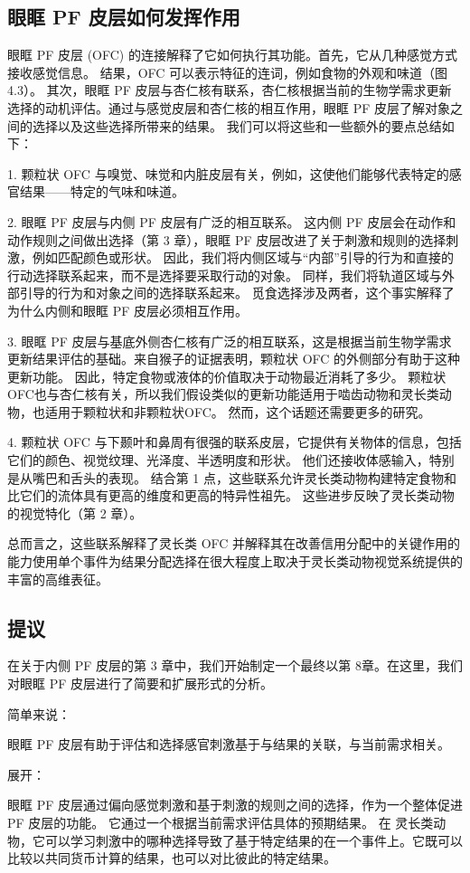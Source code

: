 \subsection{眼眶 PF 皮层如何发挥作用}
眼眶 PF 皮层 (OFC) 的连接解释了它如何执行其功能。首先，它从几种感觉方式接收感觉信息。 结果，OFC 可以表示特征的连词，例如食物的外观和味道（图 4.3）。 其次，眼眶 PF 皮层与杏仁核有联系，杏仁核根据当前的生物学需求更新选择的动机评估。通过与感觉皮层和杏仁核的相互作用，眼眶 PF 皮层了解对象之间的选择以及这些选择所带来的结果。 我们可以将这些和一些额外的要点总结如下：\par
1. 颗粒状 OFC 与嗅觉、味觉和内脏皮层有关，例如，这使他们能够代表特定的感官结果——特定的气味和味道。\par
2. 眼眶 PF 皮层与内侧 PF 皮层有广泛的相互联系。 这内侧 PF 皮层会在动作和动作规则之间做出选择（第 3 章），眼眶 PF 皮层改进了关于刺激和规则的选择刺激，例如匹配颜色或形状。 因此，我们将内侧区域与“内部”引导的行为和直接的行动选择联系起来，而不是选择要采取行动的对象。 同样，我们将轨道区域与外部引导的行为和对象之间的选择联系起来。 觅食选择涉及两者，这个事实解释了为什么内侧和眼眶 PF 皮层必须相互作用。\par
3. 眼眶 PF 皮层与基底外侧杏仁核有广泛的相互联系，这是根据当前生物学需求更新结果评估的基础。来自猴子的证据表明，颗粒状 OFC 的外侧部分有助于这种更新功能。 因此，特定食物或液体的价值取决于动物最近消耗了多少。 颗粒状OFC也与杏仁核有关，所以我们假设类似的更新功能适用于啮齿动物和灵长类动物，也适用于颗粒状和非颗粒状OFC。 然而，这个话题还需要更多的研究。\par
4. 颗粒状 OFC 与下颞叶和鼻周有很强的联系皮层，它提供有关物体的信息，包括它们的颜色、视觉纹理、光泽度、半透明度和形状。 他们还接收体感输入，特别是从嘴巴和舌头的表现。 结合第 1 点，这些联系允许灵长类动物构建特定食物和比它们的流体具有更高的维度和更高的特异性祖先。 这些进步反映了灵长类动物的视觉特化（第 2 章）。\par
总而言之，这些联系解释了灵长类 OFC 并解释其在改善信用分配中的关键作用的能力使用单个事件为结果分配选择在很大程度上取决于灵长类动物视觉系统提供的丰富的高维表征。
\subsection{提议}
在关于内侧 PF 皮层的第 3 章中，我们开始制定一个最终以第 8章。在这里，我们对眼眶 PF 皮层进行了简要和扩展形式的分析。\par
简单来说：\par
眼眶 PF 皮层有助于评估和选择感官刺激基于与结果的关联，与当前需求相关。\par
展开：\par
眼眶 PF 皮层通过偏向感觉刺激和基于刺激的规则之间的选择，作为一个整体促进 PF 皮层的功能。 它通过一个根据当前需求评估具体的预期结果。 在
灵长类动物，它可以学习刺激中的哪种选择导致了基于特定结果的在一个事件上。它既可以比较以共同货币计算的结果，也可以对比彼此的特定结果。\par
